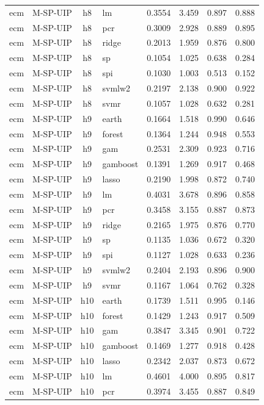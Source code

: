 \begin{ThreePartTable}
\begin{longtable}[t]{llclcccc}
ecm & M-SP-UIP & h8 & lm & 0.3554 & 3.459 & 0.897 & 0.888\\
ecm & M-SP-UIP & h8 & pcr & 0.3009 & 2.928 & 0.889 & 0.895\\
ecm & M-SP-UIP & h8 & ridge & 0.2013 & 1.959 & 0.876 & 0.800\\
ecm & M-SP-UIP & h8 & sp & 0.1054 & 1.025 & 0.638 & 0.284\\
ecm & M-SP-UIP & h8 & spi & 0.1030 & 1.003 & 0.513 & 0.152\\
ecm & M-SP-UIP & h8 & svmlw2 & 0.2197 & 2.138 & 0.900 & 0.922\\
ecm & M-SP-UIP & h8 & svmr & 0.1057 & 1.028 & 0.632 & 0.281\\
\addlinespace
ecm & M-SP-UIP & h9 & earth & 0.1664 & 1.518 & 0.990 & 0.646\\
ecm & M-SP-UIP & h9 & forest & 0.1364 & 1.244 & 0.948 & 0.553\\
ecm & M-SP-UIP & h9 & gam & 0.2531 & 2.309 & 0.923 & 0.716\\
ecm & M-SP-UIP & h9 & gamboost & 0.1391 & 1.269 & 0.917 & 0.468\\
ecm & M-SP-UIP & h9 & lasso & 0.2190 & 1.998 & 0.872 & 0.740\\
ecm & M-SP-UIP & h9 & lm & 0.4031 & 3.678 & 0.896 & 0.858\\
ecm & M-SP-UIP & h9 & pcr & 0.3458 & 3.155 & 0.887 & 0.873\\
ecm & M-SP-UIP & h9 & ridge & 0.2165 & 1.975 & 0.876 & 0.770\\
ecm & M-SP-UIP & h9 & sp & 0.1135 & 1.036 & 0.672 & 0.320\\
ecm & M-SP-UIP & h9 & spi & 0.1127 & 1.028 & 0.633 & 0.236\\
ecm & M-SP-UIP & h9 & svmlw2 & 0.2404 & 2.193 & 0.896 & 0.900\\
ecm & M-SP-UIP & h9 & svmr & 0.1167 & 1.064 & 0.762 & 0.328\\
\addlinespace
ecm & M-SP-UIP & h10 & earth & 0.1739 & 1.511 & 0.995 & 0.146\\
ecm & M-SP-UIP & h10 & forest & 0.1429 & 1.243 & 0.917 & 0.509\\
ecm & M-SP-UIP & h10 & gam & 0.3847 & 3.345 & 0.901 & 0.722\\
ecm & M-SP-UIP & h10 & gamboost & 0.1469 & 1.277 & 0.918 & 0.428\\
ecm & M-SP-UIP & h10 & lasso & 0.2342 & 2.037 & 0.873 & 0.672\\
ecm & M-SP-UIP & h10 & lm & 0.4601 & 4.000 & 0.895 & 0.817\\
ecm & M-SP-UIP & h10 & pcr & 0.3974 & 3.455 & 0.887 & 0.849\\

\end{longtable}
\end{ThreePartTable}
